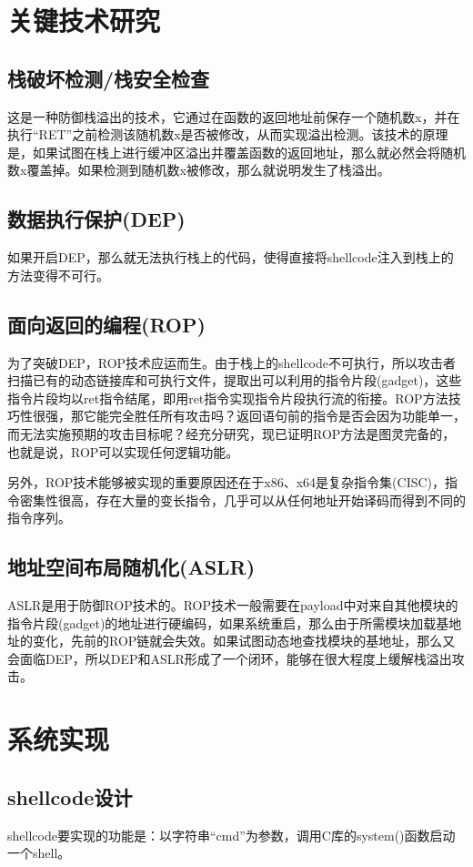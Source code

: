 \documentclass[bachelor]{thesis-uestc}
\begin{document}
\chapter{关键技术研究}
\section{栈破坏检测/栈安全检查}
这是一种防御栈溢出的技术，它通过在函数的返回地址前保存一个随机数x，并在执行``RET''之前检测该随机数x是否被修改，从而实现溢出检测。该技术的原理是，如果试图在栈上进行缓冲区溢出并覆盖函数的返回地址，那么就必然会将随机数x覆盖掉。如果检测到随机数x被修改，那么就说明发生了栈溢出。

\section{数据执行保护(DEP)}
如果开启DEP，那么就无法执行栈上的代码，使得直接将shellcode注入到栈上的方法变得不可行。

\section{面向返回的编程(ROP)}
为了突破DEP，ROP技术应运而生。由于栈上的shellcode不可执行，所以攻击者扫描已有的动态链接库和可执行文件，提取出可以利用的指令片段(gadget)，这些指令片段均以ret指令结尾，即用ret指令实现指令片段执行流的衔接。ROP方法技巧性很强，那它能完全胜任所有攻击吗？返回语句前的指令是否会因为功能单一，而无法实施预期的攻击目标呢？经充分研究，现已证明ROP方法是图灵完备的，也就是说，ROP可以实现任何逻辑功能。\par
另外，ROP技术能够被实现的重要原因还在于x86、x64是复杂指令集(CISC)，指令密集性很高，存在大量的变长指令，几乎可以从任何地址开始译码而得到不同的指令序列。

\section{地址空间布局随机化(ASLR)}
ASLR是用于防御ROP技术的。ROP技术一般需要在payload中对来自其他模块的指令片段(gadget)的地址进行硬编码，如果系统重启，那么由于所需模块加载基地址的变化，先前的ROP链就会失效。如果试图动态地查找模块的基地址，那么又会面临DEP，所以DEP和ASLR形成了一个闭环，能够在很大程度上缓解栈溢出攻击。

\chapter{系统实现}
\section{shellcode设计}
shellcode要实现的功能是：以字符串``cmd''为参数，调用C库的system()函数启动一个shell。
\end{document}
